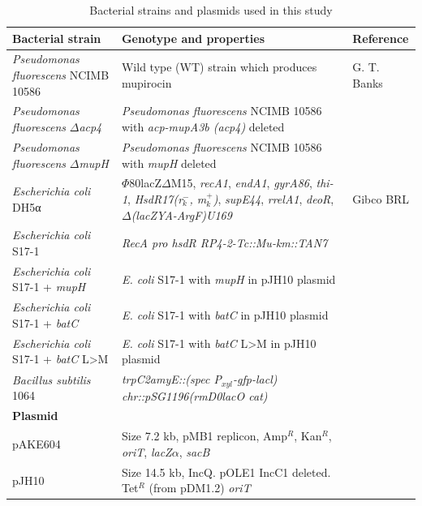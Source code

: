 		\begin{table}[htbp]
		\caption{Bacterial strains and plasmids used in this study}
		\begin{center}
		\begin{tabularx}{\textwidth}{p{4cm}Xp{3cm}}
		\toprule[2pt]
		\textbf{Bacterial strain} & \textbf{Genotype and properties} & \textbf{Reference} \\ 
		\midrule[1pt]
		\textit{Pseudomonas fluorescens} NCIMB 10586 & Wild type (WT) strain which produces mupirocin & G. T. Banks \\ 
		\textit{Pseudomonas fluorescens} $ \Delta $\textit{acp4} & \textit{Pseudomonas fluorescens} NCIMB 10586 with \textit{acp-mupA3b (acp4)} deleted & \parencite{Rahman2005} \\ 
		\textit{Pseudomonas fluorescens}  $ \Delta $\textit{mupH} & \textit{Pseudomonas fluorescens} NCIMB 10586 with \textit{mupH} deleted & \textcite{Wu2007} \\ 
		\textit{Escherichia coli} DH5α & $ \Phi $80lacZ$ \Delta $M15, \textit{recA1}, \textit{endA1}, \textit{gyrA86}, \textit{thi-1}, \textit{HsdR17(r$ _{k}^{-} $, m$ _{k}^{+} $)}, \textit{supE44}, \textit{rrelA1}, \textit{deoR}, $ \Delta $\textit{(lacZYA-ArgF)U169 } & Gibco BRL \\ 
		\textit{Escherichia coli} S17-1 & \textit{RecA pro hsdR RP4-2-Tc::Mu-km::TAN7} & \textcite{Simon1983}\\ 
		\textit{Escherichia coli} S17-1 + \textit{mupH} & \textit{E. coli} S17-1 with \textit{mupH} in pJH10 plasmid & \textcite{Haines2013}\\ 
		\textit{Escherichia coli} S17-1 + \textit{batC} & \textit{E. coli} S17-1 with \textit{batC} in pJH10 plasmid & \textcite{Haines2013}\\ 		
		\textit{Escherichia coli} S17-1 + \textit{batC} L\textgreater M & \textit{E. coli} S17-1 with \textit{batC} L\textgreater M in pJH10 plasmid & \textcite{Haines2013}\\ 		
		\textit{Bacillus subtilis} 1064 & \textit{trpC2amyE::(spec P$ _{xyl} $-gfp-lacl)} \textit{chr::pSG1196(rmD0lacO cat)} & \textcite{Moir1979} \\ 
		\textbf{Plasmid} &  & \\ 
		pAKE604 & Size 7.2 kb, pMB1 replicon, Amp$ ^{R} $, Kan$ ^{R} $, \textit{oriT}, \textit{lacZ$ \alpha $}, \textit{sacB} & \textcite{El-Sayed2001}\\ 
		pJH10 & Size 14.5 kb, IncQ. pOLE1 IncC1 deleted. Tet$ ^{R} $ (from pDM1.2) \textit{oriT} & \textcite{El-Sayed2001}\\ 
		\bottomrule[2pt]
		\end{tabularx}
		\end{center}
		\label{bacterialStrainSummary}
		\end{table}
		
